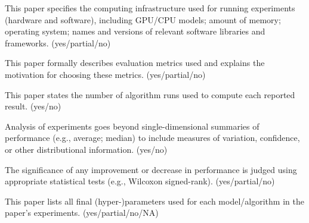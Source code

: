 This paper specifies the computing infrastructure used for running experiments (hardware and software), including GPU/CPU models; amount of memory; operating system; names and versions of relevant software libraries and frameworks. (yes/partial/no)

This paper formally describes evaluation metrics used and explains the motivation for choosing these metrics. (yes/partial/no)

This paper states the number of algorithm runs used to compute each reported result. (yes/no)

Analysis of experiments goes beyond single-dimensional summaries of performance (e.g., average; median) to include measures of variation, confidence, or other distributional information. (yes/no)

The significance of any improvement or decrease in performance is judged using appropriate statistical tests (e.g., Wilcoxon signed-rank). (yes/partial/no)

This paper lists all final (hyper-)parameters used for each model/algorithm in the paper’s experiments. (yes/partial/no/NA)

